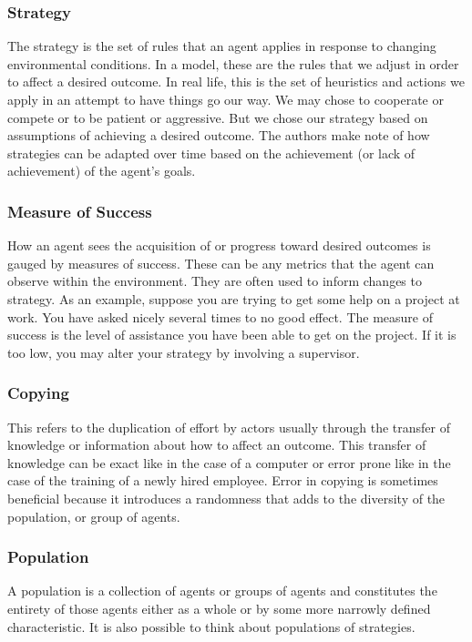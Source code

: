 \documentclass[jou,apacite]{apa6}
\begin{document}
\subsubsection{Strategy}
The strategy is the set of rules that an agent applies in response to changing environmental conditions.  In a model, these are the rules that we adjust in order to affect a desired outcome.  In real life, this is the set of heuristics and actions we apply in an attempt to have things go our way.  We may chose to cooperate or compete or to be patient or aggressive.  But we chose our strategy based on assumptions of achieving a desired outcome.  The authors make note of how strategies can
be adapted over time based on the achievement (or lack of achievement) of the agent's goals.

\subsubsection{Measure of Success}
How an agent sees the acquisition of or progress toward desired outcomes is gauged by measures of success.  These can be any metrics that the agent can observe within the environment.  They are often used to inform changes to strategy.  As an example, suppose you are trying to get some help on a project at work.  You have asked nicely several times to no good effect.  The measure of success is the level of assistance you have been able to get on the project.  If it is too low, you may alter
your strategy by involving a supervisor.

\subsubsection{Copying}
This refers to the duplication of effort by actors usually through the transfer of knowledge or information about how to affect an outcome.   This transfer of knowledge can be exact like in the case of a computer or error prone like in the case of the training of a newly hired employee.  Error in copying is sometimes beneficial because it introduces a randomness that adds to the diversity of the population, or group of agents.

\subsubsection{Population}
A population is a collection of agents or groups of agents and constitutes the entirety of those agents either as a whole or by some more narrowly defined characteristic.  It is also possible to think about populations of strategies.
\end{document}
